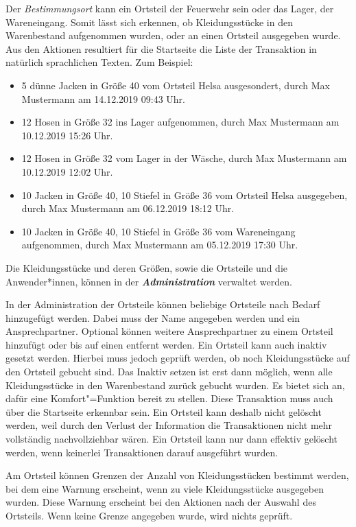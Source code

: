 Der \textit{Bestimmungsort} kann ein Ortsteil der Feuerwehr sein oder das Lager, \bzw der Wareneingang. Somit lässt sich erkennen, ob Kleidungsstücke in den Warenbestand aufgenommen wurden, oder an einen Ortsteil ausgegeben wurde.
Aus den Aktionen resultiert für die Startseite die Liste der Transaktion in natürlich sprachlichen Texten. Zum Beispiel: 
\begin{itemize}
\item 5 dünne Jacken in Größe 40 vom Ortsteil Helsa ausgesondert, durch Max Mustermann am 14.12.2019 09:43 Uhr.
\item 12 Hosen in Größe 32 ins Lager aufgenommen, durch Max Mustermann am 10.12.2019 15:26 Uhr.
\item 12 Hosen in Größe 32 vom Lager in der Wäsche, durch Max Mustermann am 10.12.2019 12:02 Uhr.
\item 10 Jacken in Größe 40, 10 Stiefel in Größe 36 vom Ortsteil Helsa ausgegeben, durch Max Mustermann am 06.12.2019 18:12 Uhr.
\item 10 Jacken in Größe 40, 10 Stiefel in Größe 36 vom Wareneingang aufgenommen, durch Max Mustermann am 05.12.2019 17:30 Uhr.
\end{itemize}

Die Kleidungsstücke und deren Größen, sowie die Ortsteile und die Anwender*innen, können in der \textbf{\textit{Administration}} verwaltet werden.

In der Administration der Ortsteile können beliebige Ortsteile nach Bedarf hinzugefügt werden. Dabei muss der Name angegeben werden und ein Ansprechpartner. Optional können weitere Ansprechpartner zu einem Ortsteil hinzufügt oder bis auf einen entfernt werden. Ein Ortsteil kann auch inaktiv gesetzt werden. Hierbei muss jedoch geprüft werden, ob noch Kleidungsstücke auf den Ortsteil gebucht sind. Das Inaktiv setzen ist erst dann möglich, wenn alle Kleidungsstücke in den Warenbestand zurück gebucht wurden. Es bietet sich an, dafür eine Komfort"=Funktion bereit zu stellen. Diese Transaktion muss auch über die Startseite erkennbar sein. Ein Ortsteil kann deshalb nicht gelöscht werden, weil durch den Verlust der Information die Transaktionen nicht mehr vollständig nachvollziehbar wären. Ein Ortsteil kann nur dann effektiv gelöscht werden, wenn keinerlei Transaktionen darauf ausgeführt wurden.

Am Ortsteil können Grenzen der Anzahl von Kleidungsstücken bestimmt werden, bei dem eine Warnung erscheint, wenn zu viele Kleidungsstücke ausgegeben wurden. Diese Warnung erscheint bei den Aktionen nach der Auswahl des Ortsteils. Wenn keine Grenze angegeben wurde, wird nichts geprüft.

